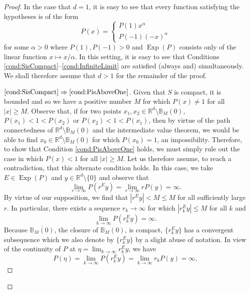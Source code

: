 \documentclass[11pt]{article}
\theoremstyle{remark}
\newcommand*{\myproofname}{Proof}
\newenvironment{subproof}[1][\myproofname]{\begin{proof}[#1]\renewcommand*{\qedsymbol}{$\mathbin{/\mkern-6mu/}$}}{\end{proof}}
\newcommand\Exp{\operatorname{Exp}}
\begin{document}
\begin{proof}
In the case that $d=1$, it is easy to see that every function satisfying the hypotheses is of the form
\begin{equation*}
P(x)=\begin{cases}
P(1)x^\alpha \\
P(-1)(-x)^\alpha
\end{cases}
\end{equation*}
for some $\alpha>0$ where $P(1),P(-1)>0$ and $\Exp(P)$ consists only of the linear function $x\mapsto x/\alpha$. In this setting, it is easy to see that Conditions \ref{cond:SisCompact}--\ref{cond:InfiniteLimit} are satisfied (always and) simultaneously. We shall therefore assume that $d>1$ for the remainder of the proof.

\begin{subproof}[$\ref{cond:SisCompact}\Rightarrow\ref{cond:PisAboveOne}$]
Given that $S$ is compact, it is bounded and so we have a positive number $M$ for which $P(x)\neq 1$ for all $|x|\geq M$. Observe that, if for two points $x_1,x_2\in \mathbb{R}^d\setminus\mathbb{B}_M(0)$, $P(x_1)<1<P(x_2)$ or $P(x_2)<1<P(x_1)$, then by virtue of the path connectedness of $\mathbb{R}^d\setminus\mathbb{B}_M(0)$ and the intermediate value theorem, we would be able to find  $x_0\in\mathbb{R}^d\setminus\mathbb{B}_M(0)$ for which $P(x_0)=1$, an impossibility. Therefore, to show that Condition \ref{cond:PisAboveOne} holds, we must simply rule out the case in which $P(x)<1$ for all $|x|\geq M$. Let us therefore assume, to reach a contradiction, that this alternate condition holds. In this case, we take $E\in\Exp(P)$ and $y\in\mathbb{R}^d\setminus \{0\}$ and observe that
\begin{equation*}
\lim_{r\to\infty}P(r^Ey)=\lim_{r\to\infty}rP(y)=\infty.
\end{equation*}
By virtue of our supposition, we find that $|r^Ey|<M\leq M$ for all sufficiently large $r$. In particular, there exists a sequence $r_k\to\infty$ for which $|r_k^Ey|\leq M$ for all $k$ and 
\begin{equation*}
\lim_{k\to\infty}P(r_k^Ey)=\infty.
\end{equation*}
Because $\overline{\mathbb{B}_M(0)}$, the closure of $\mathbb{B}_M(0)$, is compact, $\{r_k^Ey\}$ has a convergent subsequence which we also denote by $\{r_k^Ey\}$ by a slight abuse of notation. In view of the continuity of $P$ at $\eta=\lim_{k\to\infty}r_k^Ey$, we have
\begin{equation*}
P(\eta)=\lim_{k\to\infty}P(r_k^Ey)=\lim_{k\to\infty}r_kP(y)=\infty,

\end{equation*}
\end{subproof}
\end{proof}
\end{document}

